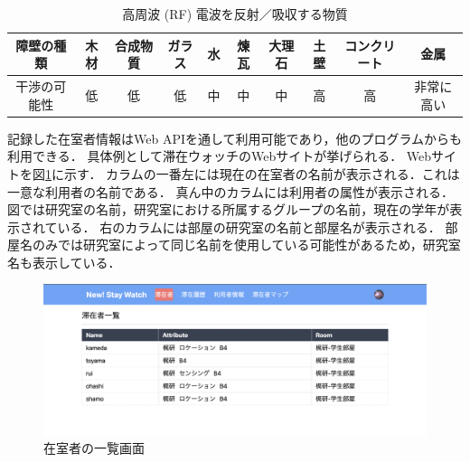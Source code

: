 


\begin{table}[H]
  \begin{center}
    \caption{高周波 (RF) 電波を反射／吸収する物質}
    \label{tb:rf}
    \begin{tabular}{|c||c|c|c|c|c|c|c|c|c|} \hline
      障壁の種類  & 木材 & 合成物質 & ガラス & 水 & 煉瓦 & 大理石 & 土壁 & コンクリート & 金属    \\ \hline
      干渉の可能性 & 低  & 低    & 低   & 中 & 中  & 中   & 高  & 高      & 非常に高い \\ \hline
    \end{tabular}
  \end{center}
\end{table}

記録した在室者情報はWeb APIを通して利用可能であり，他のプログラムからも利用できる．
具体例として滞在ウォッチのWebサイトが挙げられる．
Webサイトを図\ref{fig:stayer}に示す．
カラムの一番左には現在の在室者の名前が表示される．これは一意な利用者の名前である．
真ん中のカラムには利用者の属性が表示される．図では研究室の名前，研究室における所属するグループの名前，現在の学年が表示されている．
右のカラムには部屋の研究室の名前と部屋名が表示される．
部屋名のみでは研究室によって同じ名前を使用している可能性があるため，研究室名も表示している．





\begin{figure}[H]
  \begin{center}
    \includegraphics[width=160mm]{image/stayer.png}
    \caption{在室者の一覧画面}
    \label{fig:stayer}
  \end{center}
\end{figure}


